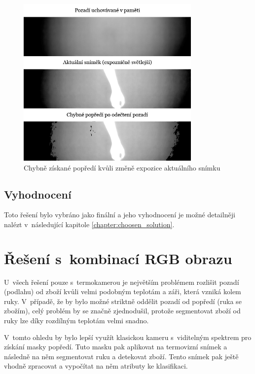     \begin{figure}[h]
      \centering
      \includegraphics[width=0.8\textwidth]{images/camera_2_apply_mog_after_nuc.png}
      \caption{Chybně získané popředí kvůli změně expozice aktuálního snímku}
      \label{fig:camera_2_apply_mog_after_nuc}
	\end{figure} 

	\subsection{Vyhodnocení}
    Toto řešení bylo vybráno jako finální a jeho vyhodnocení je možné detailněji nalézt v~následující kapitole \ref{chapter:choosen_solution}.
    
\clearpage

\section{Řešení s~kombinací RGB obrazu}\label{section:combining_rgb_and_thermal}
U~všech řešení pouze s~termokamerou je největším problémem rozlišit pozadí (podlahu) od zboží kvůli velmi podobným teplotám a záři, která vzniká kolem ruky. V~případě, že by bylo možné striktně oddělit pozadí od popředí (ruka se zbožím), celý problém by se značně zjednodušil, protože segmentovat zboží od ruky lze díky rozdílným teplotám velmi snadno. 

V~tomto ohledu by bylo lepší využít klasickou kameru s~viditelným spektrem pro získání masky popředí. Tuto masku pak aplikovat na termovizní snímek a následně na něm segmentovat ruku a detekovat zboží. Tento snímek pak ještě vhodně zpracovat a vypočítat na něm atributy ke klasifikaci.

